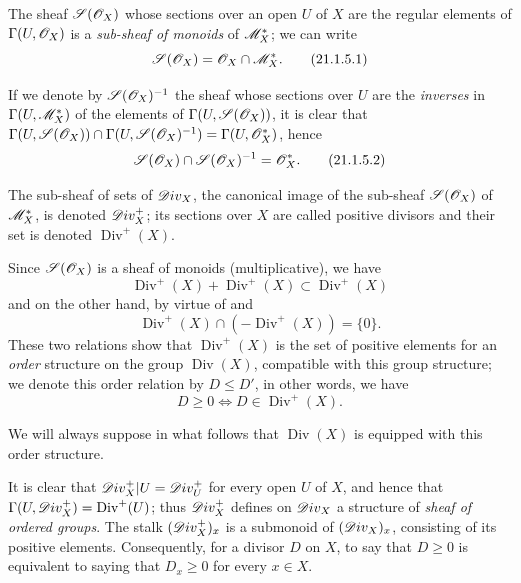 \begin{env}[21.1.5]
\label{IV.21.1.5}
The sheaf $\mathscr{S}(\mathscr{O}_X)$  whose sections over an open $U$ of $X$ are the regular elements of $\Gamma(U,\mathscr{O}_X)$ is a \emph{sub-sheaf of monoids} of $\mathscr{M}_X^*$;
we can write
\[
\label{IV.21.1.5.1}
  \mathscr{S}(\mathscr{O}_X)=\mathscr{O}_X\cap\mathscr{M}_X^*.
  \tag{21.1.5.1}
\]
\end{env}


If we denote by $\mathscr{S}(\mathscr{O}_X)^{-1}$ the sheaf whose sections over $U$ are the \emph{inverses} in $\Gamma(U,\mathscr{M}_X^*)$ of the elements of $\Gamma(U,\mathscr{S}(\mathscr{O}_X))$, it is clear that $\Gamma(U,\mathscr{S}(\mathscr{O}_X))\cap\Gamma(U,\mathscr{S}(\mathscr{O}_X)^{-1})=\Gamma(U,\mathscr{O}_X^*)$, hence
\[
\label{IV.21.1.5.2}
  \mathscr{S}(\mathscr{O}_X)\cap\mathscr{S}(\mathscr{O}_X)^{-1}=\mathscr{O}_X^*.
  \tag{21.1.5.2}
\]

\begin{definition}[21.1.6]
\label{IV.21.1.6}
The sub-sheaf of sets of $\mathscr{D}iv_X$, the canonical image of the sub-sheaf $\mathscr{S}(\mathscr{O}_X)$ of $\mathscr{M}_X^*$, is denoted $\mathscr{D}iv_X^+$;
its sections over $X$ are called positive divisors and their set is denoted $\operatorname{Div}^+(X)$.
\end{definition}

Since $\mathscr{S}(\mathscr{O}_X)$ is a sheaf of monoids (multiplicative), we have
\[
\label{IV.21.1.6.1}
  \operatorname{Div}^+(X)+\operatorname{Div}^+(X)\subset\operatorname{Div}^+(X)
  \tag{21.1.6.1}
\]
and on the other hand, by virtue of  and 
\[
\label{IV.21.1.6.2}
  \operatorname{Div}^+(X)\cap(-\operatorname{Div}^+(X))=\{0\}.
  \tag{21.1.6.2}
\]
These two relations show that $\operatorname{Div}^+(X)$ is the set of positive elements for an \emph{order} structure on the group $\operatorname{Div}(X)$, compatible with this group structure;
we denote this order relation by $D\leq D'$, in other words, we have
\[
\label{IV.21.1.6.3}
  D\geq 0 \iff D\in\operatorname{Div}^+(X).
  \tag{21.1.6.3}
\]

We will always suppose in what follows that $\operatorname{Div}(X)$ is equipped with this order structure.

It is clear that $\mathscr{D}iv_X^+|U=\mathscr{D}iv_U^+$ for every open $U$ of $X$, and hence that
$\Gamma(U,\mathscr{D}iv_X^+)=\operatorname{Div}^+(U)$;
thus $\mathscr{D}iv_X^+$ defines on $\mathscr{D}iv_X$ a structure of \emph{sheaf of ordered groups}.
The stalk $(\mathscr{D}iv_X^+)_x$ is a submonoid of $(\mathscr{D}iv_X)_x$, consisting of its positive elements.
Consequently, for a divisor $D$ on $X$, to say that $D\geq0$ is equivalent to saying that $D_x\geq0$ for every $x\in X$.

